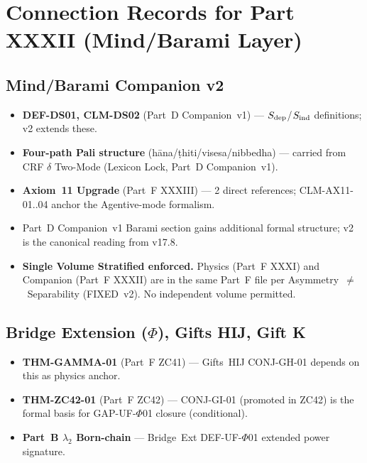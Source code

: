 \documentclass[12pt, a4paper]{article}
\begin{document}
\newpage

\section{Connection Records for Part XXXII (Mind/Barami Layer)}
\label{sec:cmap-mind}

\subsection{Mind/Barami Companion v2}

\begin{inheritbox}
\begin{itemize}[leftmargin=*, noitemsep]
\item \textbf{DEF-DS01, CLM-DS02} (Part~D Companion~v1) ---
  $S_{\rm dep}$/$S_{\rm ind}$ definitions; v2 extends these.
\item \textbf{Four-path Pali structure}
  (h\={a}na/\d{t}hiti/visesa/nibbedha) --- carried from
  CRF $\delta$ Two-Mode (Lexicon Lock, Part~D Companion~v1).
\item \textbf{Axiom~11 Upgrade} (Part~F XXXIII) ---
  2 direct references; CLM-AX11-01..04 anchor the
  Agentive-mode formalism.
\end{itemize}
\end{inheritbox}

\begin{correctionbox}
\begin{itemize}[leftmargin=*, noitemsep]
\item {}
  Part~D Companion~v1 Barami section gains additional
  formal structure; v2 is the canonical reading from v17.8.
\item \textbf{Single Volume Stratified enforced.}
  Physics (Part~F XXXI) and Companion (Part~F XXXII) are
  in the same Part~F file per Asymmetry~$\neq$~Separability
  (FIXED~v2). No independent volume permitted.
\end{itemize}
\end{correctionbox}

\subsection{Bridge Extension ($\Phi$), Gifts HIJ, Gift K}

\begin{inheritbox}
\begin{itemize}[leftmargin=*, noitemsep]
\item \textbf{THM-GAMMA-01} (Part~F ZC41) ---
  Gifts~HIJ CONJ-GH-01 depends on this as physics anchor.
\item \textbf{THM-ZC42-01} (Part~F ZC42) ---
  CONJ-GI-01 (promoted in ZC42) is the formal basis for
  GAP-UF-$\Phi$01 closure (conditional).
\item \textbf{Part~B $\lambda_2$ Born-chain} ---
  Bridge~Ext DEF-UF-$\Phi$01 extended power signature.
\end{itemize}
\end{inheritbox}
\end{document}
